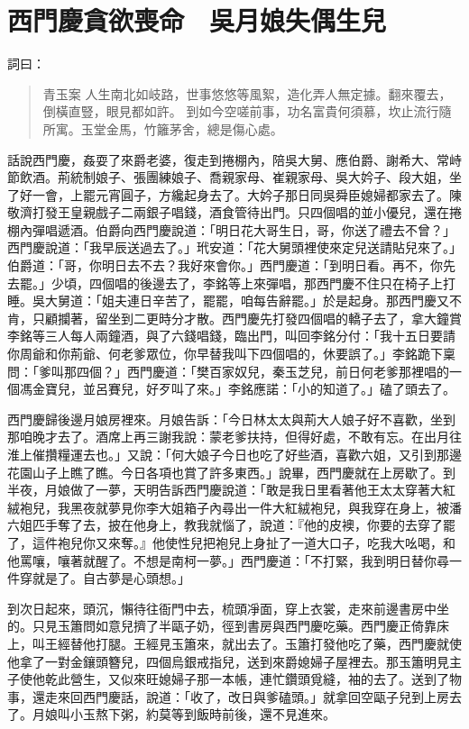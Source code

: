 
\chapter{西門慶貪欲喪命　吳月娘失偶生兒}

詞曰：
\begin{quote}
青玉案
人生南北如岐路，世事悠悠等風絮，造化弄人無定據。翻來覆去，倒橫直豎，眼見都如許。
到如今空嗟前事，功名富貴何須慕，坎止流行隨所寓。玉堂金馬，竹籬茅舍，總是傷心處。
\end{quote}

話說西門慶，姦耍了來爵老婆，復走到捲棚內，陪吳大舅、應伯爵、謝希大、常峙節飲酒。荊統制娘子、張團練娘子、喬親家母、崔親家母、吳大妗子、段大姐，坐了好一會，上罷元宵圓子，方纔起身去了。大妗子那日同吳舜臣媳婦都家去了。陳敬濟打發王皇親戲子二兩銀子唱錢，酒食管待出門。只四個唱的並小優兒，還在捲棚內彈唱遞酒。伯爵向西門慶說道：「明日花大哥生日，哥，你送了禮去不曾？」西門慶說道：「我早辰送過去了。」玳安道：「花大舅頭裡使來定兒送請貼兒來了。」伯爵道：「哥，你明日去不去？我好來會你。」西門慶道：「到明日看。再不，你先去罷。」少頃，四個唱的後邊去了，李銘等上來彈唱，那西門慶不住只在椅子上打睡。吳大舅道：「姐夫連日辛苦了，罷罷，咱每告辭罷。」於是起身。那西門慶又不肯，只顧攔著，留坐到二更時分才散。西門慶先打發四個唱的轎子去了，拿大鐘賞李銘等三人每人兩鐘酒，與了六錢唱錢，臨出門，叫回李銘分付：「我十五日要請你周爺和你荊爺、何老爹眾位，你早替我叫下四個唱的，休要誤了。」李銘跪下稟問：「爹叫那四個？」西門慶道：「樊百家奴兒，秦玉芝兒，前日何老爹那裡唱的一個馮金寶兒，並呂賽兒，好歹叫了來。」李銘應諾：「小的知道了。」磕了頭去了。

西門慶歸後邊月娘房裡來。月娘告訴：「今日林太太與荊大人娘子好不喜歡，坐到那咱晚才去了。酒席上再三謝我說：蒙老爹扶持，但得好處，不敢有忘。在出月往淮上催攢糧運去也。」又說：「何大娘子今日也吃了好些酒，喜歡六姐，又引到那邊花園山子上瞧了瞧。今日各項也賞了許多東西。」說畢，西門慶就在上房歇了。到半夜，月娘做了一夢，天明告訴西門慶說道：「敢是我日里看著他王太太穿著大紅絨袍兒，我黑夜就夢見你李大姐箱子內尋出一件大紅絨袍兒，與我穿在身上，被潘六姐匹手奪了去，披在他身上，教我就惱了，說道：『他的皮襖，你要的去穿了罷了，這件袍兒你又來奪。』他使性兒把袍兒上身扯了一道大口子，吃我大吆喝，和他罵嚷，嚷著就醒了。不想是南柯一夢。」西門慶道：「不打緊，我到明日替你尋一件穿就是了。自古夢是心頭想。」

到次日起來，頭沉，懶待往衙門中去，梳頭凈面，穿上衣裳，走來前邊書房中坐的。只見玉簫問如意兒擠了半甌子奶，徑到書房與西門慶吃藥。西門慶正倚靠床上，叫王經替他打腿。王經見玉簫來，就出去了。玉簫打發他吃了藥，西門慶就使他拿了一對金鑲頭簪兒，四個烏銀戒指兒，送到來爵媳婦子屋裡去。那玉簫明見主子使他乾此營生，又似來旺媳婦子那一本帳，連忙鑽頭覓縫，袖的去了。送到了物事，還走來回西門慶話，說道：「收了，改日與爹磕頭。」就拿回空甌子兒到上房去了。月娘叫小玉熬下粥，約莫等到飯時前後，還不見進來。

